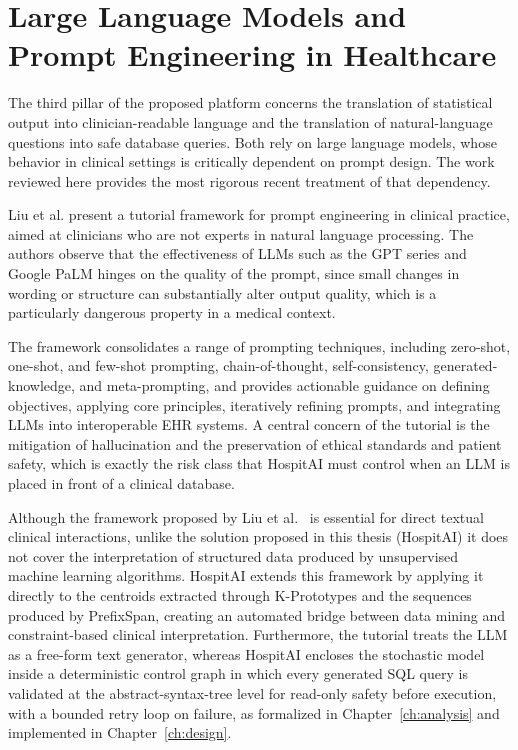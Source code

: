 \section{Large Language Models and Prompt Engineering in Healthcare}\label{sec:rw_llm}

The third pillar of the proposed platform concerns the translation of statistical output into clinician-readable language and the translation of natural-language questions into safe database queries. Both rely on large language models, whose behavior in clinical settings is critically dependent on prompt design. The work reviewed here provides the most rigorous recent treatment of that dependency.

Liu et al. \cite{liu2025} present a tutorial framework for prompt engineering in clinical practice, aimed at clinicians who are not experts in natural language processing. The authors observe that the effectiveness of LLMs such as the GPT series and Google PaLM hinges on the quality of the prompt, since small changes in wording or structure can substantially alter output quality, which is a particularly dangerous property in a medical context.

The framework consolidates a range of prompting techniques, including zero-shot, one-shot, and few-shot prompting, chain-of-thought, self-consistency, generated-knowledge, and meta-prompting, and provides actionable guidance on defining objectives, applying core principles, iteratively refining prompts, and integrating LLMs into interoperable EHR systems. A central concern of the tutorial is the mitigation of hallucination and the preservation of ethical standards and patient safety, which is exactly the risk class that HospitAI must control when an LLM is placed in front of a clinical database.

Although the framework proposed by Liu et al.\ \cite{liu2025} is essential for direct textual clinical interactions, unlike the solution proposed in this thesis (HospitAI) it does not cover the interpretation of structured data produced by unsupervised machine learning algorithms. HospitAI extends this framework by applying it directly to the centroids extracted through K-Prototypes and the sequences produced by PrefixSpan, creating an automated bridge between data mining and constraint-based clinical interpretation. Furthermore, the tutorial treats the LLM as a free-form text generator, whereas HospitAI encloses the stochastic model inside a deterministic control graph in which every generated SQL query is validated at the abstract-syntax-tree level for read-only safety before execution, with a bounded retry loop on failure, as formalized in Chapter~\ref{ch:analysis} and implemented in Chapter~\ref{ch:design}.

